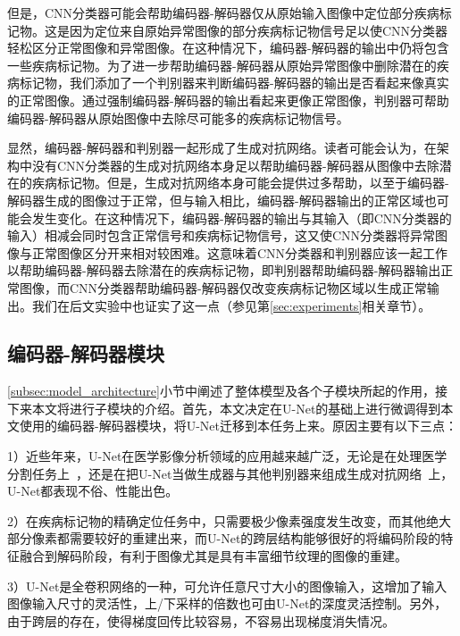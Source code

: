 但是，CNN分类器可能会帮助编码器-解码器仅从原始输入图像中定位部分疾病标记物。这是因为定位来自原始异常图像的部分疾病标记物信号足以使CNN分类器轻松区分正常图像和异常图像。在这种情况下，编码器-解码器的输出中仍将包含一些疾病标记物。为了进一步帮助编码器-解码器从原始异常图像中删除潜在的疾病标记物，我们添加了一个判别器来判断编码器-解码器的输出是否看起来像真实的正常图像。通过强制编码器-解码器的输出看起来更像正常图像，判别器可帮助编码器-解码器从原始图像中去除尽可能多的疾病标记物信号。

显然，编码器-解码器和判别器一起形成了生成对抗网络。读者可能会认为，在架构中没有CNN分类器的生成对抗网络本身足以帮助编码器-解码器从图像中去除潜在的疾病标记物。但是，生成对抗网络本身可能会提供过多帮助，以至于编码器-解码器生成的图像过于正常，但与输入相比，编码器-解码器输出的正常区域也可能会发生变化。在这种情况下，编码器-解码器的输出与其输入（即CNN分类器的输入）相减会同时包含正常信号和疾病标记物信号，这又使CNN分类器将异常图像与正常图像区分开来相对较困难。这意味着CNN分类器和判别器应该一起工作以帮助编码器-解码器去除潜在的疾病标记物，即判别器帮助编码器-解码器输出正常图像，而CNN分类器帮助编码器-解码器仅改变疾病标记物区域以生成正常输出。我们在后文实验中也证实了这一点（参见第\ref{sec:experiments}相关章节）。

\subsection{编码器-解码器模块}\label{subsec:encoder_decoder_model}
\ref{subsec:model_architecture}小节中阐述了整体模型及各个子模块所起的作用，接下来本文将进行子模块的介绍。首先，本文决定在U-Net的基础上进行微调得到本文使用的编码器-解码器模块，将U-Net迁移到本任务上来。原因主要有以下三点：

1）近些年来，U-Net在医学影像分析领域的应用越来越广泛，无论是在处理医学分割任务上~\cite{oktay2018attention, dong2017automatic, zhang2018ct}，还是在把U-Net当做生成器与其他判别器来组成生成对抗网络~\cite{Han2018SpineGANSS}上，U-Net都表现不俗、性能出色。

2）在疾病标记物的精确定位任务中，只需要极少像素强度发生改变，而其他绝大部分像素都需要较好的重建出来，而U-Net的跨层结构能够很好的将编码阶段的特征融合到解码阶段，有利于图像尤其是具有丰富细节纹理的图像的重建。

3）U-Net是全卷积网络的一种，可允许任意尺寸大小的图像输入，这增加了输入图像输入尺寸的灵活性，上/下采样的倍数也可由U-Net的深度灵活控制。另外，由于跨层的存在，使得梯度回传比较容易，不容易出现梯度消失情况。

